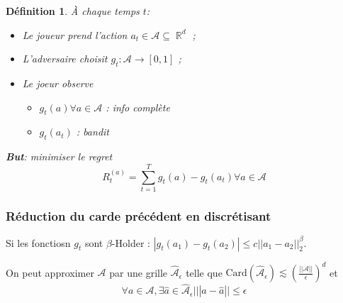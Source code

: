 \documentclass{article}
\DeclareMathOperator*{\R}{\mathbb{R}}
\newtheorem{definition}{Définition}[section]
\theoremstyle{remark}
\theoremstyle{remark}
\begin{document}
\begin{definition}
   À chaque temps $t$:
   \begin{itemize}
      \item Le joueur prend l'action $a_t \in \mathcal{A} \subseteq \R^d$ ;
      \item L'adversaire choisit $g_t: \mathcal{A} \rightarrow [0,1]$ ;
      \item Le joeur observe
      \begin{itemize}
         \item $g_t(a) \forall a \in \mathcal{A}$ : info complète
         \item $g_t(a_t)$ : bandit
      \end{itemize}
   \end{itemize}

   \textbf{But}: minimiser le regret
   $$
   R_t^{(a)} = \sum_{t=1}^T g_t(a) - g_t(a_t) \forall a \in \mathcal{A}
   $$
\end{definition}

\subsubsection{Réduction du carde précédent en discrétisant}

Si les fonctiosn $g_t$ sont $\beta$-Holder : $|g_t(a_1) - g_t(a_2)| \leq c ||a_1-a_2||_2^\beta$.

On peut approximer $\mathcal{A}$ par une grille $\widehat{\mathcal{A}}_\epsilon$ telle que $\text{Card}(\widehat{\mathcal{A}}_\epsilon) \lesssim \left(\frac{|| \mathcal{A} ||}{\epsilon}\right)^d$ et
$$
\forall a \in \mathcal{A},  \exists \hat{a} \in \widehat{\mathcal{A}}_\epsilon | ||a - \hat{a} || \leq \epsilon
$$
\end{document}
